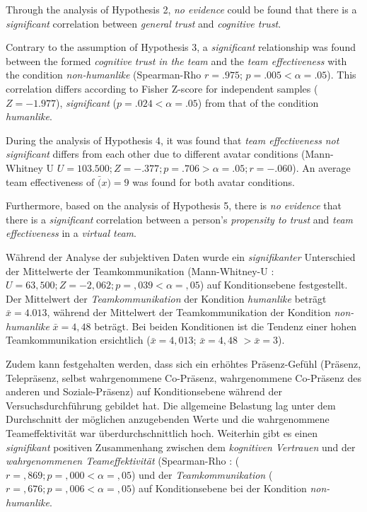 \documentclass[sigchi]{acmart}
\begin{document}
Through the analysis of Hypothesis 2, \textit{no evidence} could be found that there is a \textit{significant} correlation between \textit{general trust} and \textit{cognitive trust}. 

Contrary to the assumption of Hypothesis 3, a \textit{significant} relationship was found between the formed \textit{cognitive trust in the team} and the \textit{team effectiveness} with the condition \textit{non-humanlike} (Spearman-Rho $r =.975$; $p =.005 < \alpha = .05$). This correlation differs according to Fisher Z-score for independent samples ($Z=-1.977$), \textit{significant} ($p =.024 < \alpha = .05$) from that of the condition \textit{humanlike}.
 
During the analysis of Hypothesis 4, it was found that \textit{team effectiveness} \textit{not significant} differs from each other due to different avatar conditions (Mann-Whitney U $U = 103.500; Z = -.377; p =.706 > \alpha = .05; r = -.060$). An average team effectiveness of $\bar(x) = 9$ was found for both avatar conditions.

Furthermore, based on the analysis of Hypothesis 5, there is \textit{no evidence} that there is a \textit{significant} correlation between a person's \textit{propensity to trust} and \textit{team effectiveness} in a \textit{virtual team}.

Während der Analyse der subjektiven Daten wurde ein \textit{signifikanter} Unterschied der Mittelwerte der Teamkommunikation (Mann-Whitney-U : $U = 63,500; Z = -2,062; p =,039 < \alpha = ,05$)  auf Konditionsebene festgestellt. Der Mittelwert der \textit{Teamkommunikation} der Kondition \textit{humanlike} beträgt $\bar{x} = 4.013$, während der Mittelwert der Teamkommunikation der Kondition \textit{non-humanlike} $\bar{x} = 4,48$ beträgt. Bei beiden Konditionen ist die Tendenz einer hohen Teamkommunikation ersichtlich ($\bar{x} = 4,013$; $\bar{x} = 4,48$ $ > \bar{x}  = 3$).
 
Zudem kann festgehalten werden, dass sich ein erhöhtes Präsenz-Gefühl (Präsenz, Telepräsenz, selbst wahrgenommene Co-Präsenz, wahrgenommene Co-Präsenz des anderen und Soziale-Präsenz) auf Konditionsebene während der Versuchsdurchführung gebildet hat. Die allgemeine Belastung lag unter dem Durchschnitt der möglichen anzugebenden Werte und die wahrgenommene Teameffektivität war überdurchschnittlich hoch.
Weiterhin gibt es einen \textit{signifikant} positiven Zusammenhang zwischen dem \textit{kognitiven Vertrauen} und der \textit{wahrgenommenen Teameffektivität}  (Spearman-Rho : ($r =,869; p =,000 < \alpha = ,05$) und der \textit{Teamkommunikation} ($r =,676; p =,006 < \alpha = ,05$) auf Konditionsebene bei der Kondition \textit{non-humanlike}.
\end{document}
